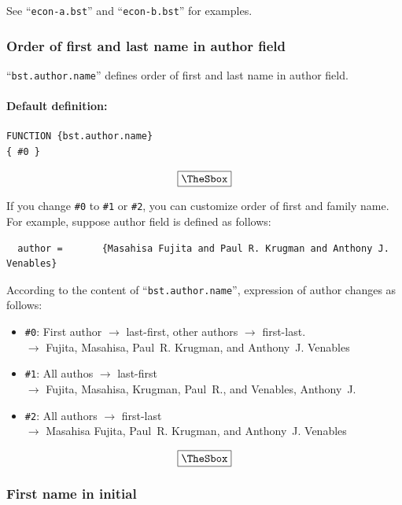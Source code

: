 \documentclass[10pt]{article}
\newenvironment{Frame}%
{\setlength{\fboxsep}{15pt}
\setlength{\mylength}{\linewidth}%
\addtolength{\mylength}{-2\fboxsep}%
\addtolength{\mylength}{-2\fboxrule}%
\Sbox
\minipage{\mylength}%
\setlength{\abovedisplayskip}{0pt}%
\setlength{\belowdisplayskip}{0pt}%
}%
{\endminipage\endSbox
\[\fbox{\TheSbox}\]}
\begin{document}
See ``\texttt{econ-a.bst}'' and ``\texttt{econ-b.bst}'' for examples.


\subsubsection{Order of first and last name in author field}

``\texttt{bst.author.name}'' defines order of first and last name in author field.

\paragraph{Default definition:}
\begin{Frame}
\begin{verbatim}
FUNCTION {bst.author.name}
{ #0 }
\end{verbatim}
\end{Frame}

If you change \verb|#0| to \verb|#1| or \verb|#2|, you can customize
order of first and family name.  For example, suppose author field is
defined as follows:
\begin{verbatim}
  author =       {Masahisa Fujita and Paul R. Krugman and Anthony J. Venables}
\end{verbatim}

According to the content of ``\texttt{bst.author.name}'', expression of
author changes as follows:
\begin{Frame}
\begin{itemize}
 \item \verb|#0|: First author $\rightarrow$ last-first, other authors
       $\rightarrow$ first-last.\\
       $\rightarrow$ Fujita, Masahisa, Paul~R. Krugman, and
       Anthony~J. Venables
 \item \verb|#1|: All authos $\rightarrow$ last-first \\
       $\rightarrow$ Fujita, Masahisa, Krugman, Paul~R., and Venables, Anthony~J.
 \item \verb|#2|: All authors $\rightarrow$ first-last \\
       $\rightarrow$ Masahisa Fujita, Paul~R. Krugman, and Anthony~J. Venables
\end{itemize}
\end{Frame}

\subsubsection{First name in initial}
\end{document}
